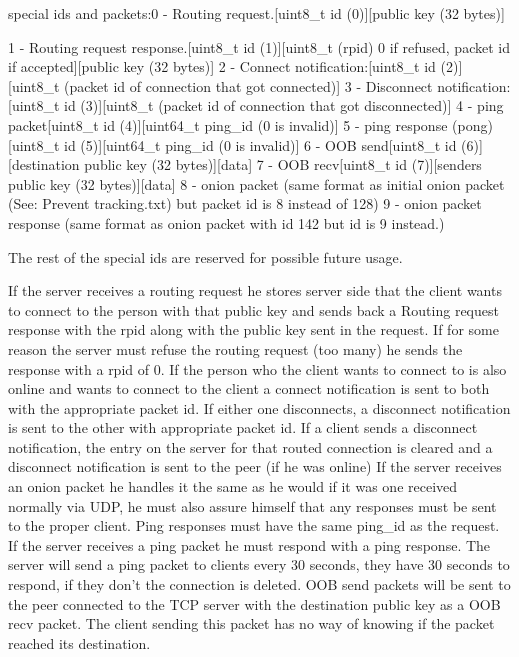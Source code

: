 \documentclass{tox}
\begin{document}
special ids and packets:0 - Routing request.[uint8_t id (0)][public key (32 bytes)]

1 - Routing request response.[uint8_t id (1)][uint8_t (rpid) 0 if refused, packet id if accepted][public key (32 bytes)]
2 - Connect notification:[uint8_t id (2)][uint8_t (packet id of connection that got connected)]
3 - Disconnect notification:[uint8_t id (3)][uint8_t (packet id of connection that got disconnected)]
4 - ping packet[uint8_t id (4)][uint64_t ping_id (0 is invalid)]
5 - ping response (pong)[uint8_t id (5)][uint64_t ping_id (0 is invalid)]
6 - OOB send[uint8_t id (6)][destination public key (32 bytes)][data]
7 - OOB recv[uint8_t id (7)][senders public key (32 bytes)][data]
8 - onion packet (same format as initial onion packet (See: Prevent tracking.txt) but packet id is 8 instead of 128)
9 - onion packet response (same format as onion packet with id 142 but id is 9 instead.)

The rest of the special ids are reserved for possible future usage.

If the server receives a routing request he stores server side that the client wants to connect to the person with that public key and sends back a Routing request response with the rpid along with the public key sent in the request.
If for some reason the server must refuse the routing request (too many) he sends the response with a rpid of 0.
If the person who the client wants to connect to is also online and wants to connect to the client a connect notification is sent to both with the appropriate packet id.
If either one disconnects, a disconnect notification is sent to the other with appropriate packet id.
If a client sends a disconnect notification, the entry on the server for that routed connection is cleared and a disconnect notification is sent to the peer (if he was online)
If the server receives an onion packet he handles it the same as he would if it was one received normally via UDP, he must also assure himself that any responses must be sent to the proper client.
Ping responses must have the same ping_id as the request.
If the server receives a ping packet he must respond with a ping response.
The server will send a ping packet to clients every 30 seconds, they have 30 seconds to respond, if they don't the connection is deleted.
OOB send packets will be sent to the peer connected to the TCP server with the destination public key as a OOB recv packet. The client sending this packet has no way of knowing if the packet reached its destination.
\end{document}
